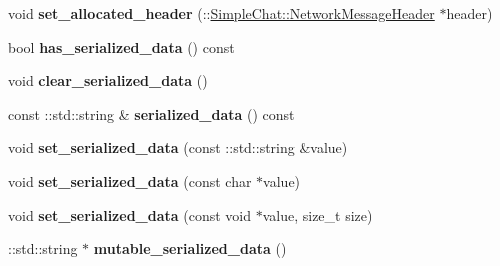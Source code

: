 \begin{DoxyCompactItemize}
\item 
\hypertarget{classSimpleChat_1_1NetworkMessage_aa51b7ba1decb1797dfd093650ba08dad}{void {\bfseries set\-\_\-allocated\-\_\-header} (\-::\hyperlink{classSimpleChat_1_1NetworkMessageHeader}{Simple\-Chat\-::\-Network\-Message\-Header} $\ast$header)}\label{classSimpleChat_1_1NetworkMessage_aa51b7ba1decb1797dfd093650ba08dad}

\item 
\hypertarget{classSimpleChat_1_1NetworkMessage_a49bb324a3189bc0a0bb625b213271525}{bool {\bfseries has\-\_\-serialized\-\_\-data} () const }\label{classSimpleChat_1_1NetworkMessage_a49bb324a3189bc0a0bb625b213271525}

\item 
\hypertarget{classSimpleChat_1_1NetworkMessage_a72d633cac4a0124182d324b69580e87f}{void {\bfseries clear\-\_\-serialized\-\_\-data} ()}\label{classSimpleChat_1_1NetworkMessage_a72d633cac4a0124182d324b69580e87f}

\item 
\hypertarget{classSimpleChat_1_1NetworkMessage_a689794b9b421d674c50d925a3efd2bba}{const \-::std\-::string \& {\bfseries serialized\-\_\-data} () const }\label{classSimpleChat_1_1NetworkMessage_a689794b9b421d674c50d925a3efd2bba}

\item 
\hypertarget{classSimpleChat_1_1NetworkMessage_aa019206f91b409b2df833901ae5b7550}{void {\bfseries set\-\_\-serialized\-\_\-data} (const \-::std\-::string \&value)}\label{classSimpleChat_1_1NetworkMessage_aa019206f91b409b2df833901ae5b7550}

\item 
\hypertarget{classSimpleChat_1_1NetworkMessage_aef9c1f1afdf935e6195c07c99c0f2bdf}{void {\bfseries set\-\_\-serialized\-\_\-data} (const char $\ast$value)}\label{classSimpleChat_1_1NetworkMessage_aef9c1f1afdf935e6195c07c99c0f2bdf}

\item 
\hypertarget{classSimpleChat_1_1NetworkMessage_a8747f5041d73f390f233f6d31d21b1ae}{void {\bfseries set\-\_\-serialized\-\_\-data} (const void $\ast$value, size\-\_\-t size)}\label{classSimpleChat_1_1NetworkMessage_a8747f5041d73f390f233f6d31d21b1ae}

\item 
\hypertarget{classSimpleChat_1_1NetworkMessage_a8f88634ab28deb0db90170be7d384c60}{\-::std\-::string $\ast$ {\bfseries mutable\-\_\-serialized\-\_\-data} ()}\label{classSimpleChat_1_1NetworkMessage_a8f88634ab28deb0db90170be7d384c60}


\end{DoxyCompactItemize}
